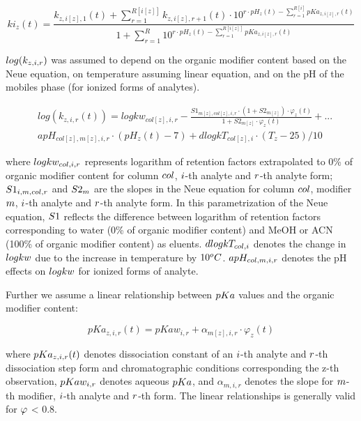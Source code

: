 \documentclass[
]{article}
\begin{document}
\[
ki_z(t)=\frac{k_{z,i[z],1}(t)+\sum_{r=1}^{R[i[z]]} k_{z,i[z],r+1}(t) \cdot 10^{r\cdot pH_z(t)-\sum_{r=1}^{R[i]} pKa_{z,i[z],r}(t)} }{1+\sum_{r=1}^R 10^{r\cdot pH_z(t)-\sum_{r=1}^{R[i[z]]} pKa_{z,i[z],r}(t) } }
\]

\(\small log(k_{z,i,r})\) was assumed to depend on the organic modifier
content based on the Neue equation, on temperature assuming linear
equation, and on the pH of the mobiles phase (for ionized forms of
analytes).

\[
\begin{aligned}
& log(k_{z,i,r}(t)) = logkw_{col[z],i,r} - \frac{S1_{m[z],col[z],i,r} \cdot (1+S2_{m[z]}) \cdot \varphi_z(t)}{1+S2_{m[z]} \cdot \varphi_z(t)} + ... \\ 
& apH_{col[z],m[z],i,r} \cdot (pH_z(t)-7) + dlogkT_{col[z],i} \cdot (T_z-25)/10
\end{aligned}
\]

where \(\small logkw_{col,i,r}\) represents logarithm of retention
factors extrapolated to 0\% of organic modifier content for column
\(\small col\), \(\small i\)-th analyte and \(\small r\)-th analyte
form; \(\small S1_{i,m,col,r}\) and \(\small S2_m\) are the slopes in
the Neue equation for column \(\small col\), modifier \(\small m\),
\(\small i\)-th analyte and \(\small r\)-th analyte form. In this
parametrization of the Neue equation, \(\small S1\) reflects the
difference between logarithm of retention factors corresponding to water
(0\% of organic modifier content) and MeOH or ACN (100\% of organic
modifier content) as eluents. \(\small dlogkT_{col,i}\) denotes the
change in \(\small logkw\) due to the increase in temperature by
\(\small 10^oC\). \(\small apH_{col,m,i,r}\) denotes the pH effects on
\(\small logkw\) for ionized forms of analyte.

Further we assume a linear relationship between \(\small pKa\) values
and the organic modifier content:

\[
pKa_{z,i,r}(t)=pKaw_{i,r}+\alpha_{m[z],i,r}\cdot\varphi_z(t)
\]

where \(\small pKa_{z,i,r}(t)\) denotes dissociation constant of an
\(\small i\)-th analyte and \(\small r\)-th dissociation step form and
chromatographic conditions corresponding the z-th observation,
\(\small pKaw_{i,r}\) denotes aqueous \(\small pKa\), and
\(\alpha_{m,i,r}\) denotes the slope for \(\small m\)-th modifier,
\(\small i\)-th analyte and \(\small r\)-th form. The linear
relationships is generally valid for \(\small \varphi\) \textless{} 0.8.
\end{document}
